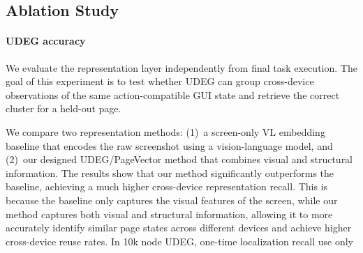 \subsection{Ablation Study}
\label{sec:eval-transfer}

\paragraph{UDEG accuracy}
We evaluate the representation layer independently from final task execution.
The goal of this experiment is to test whether UDEG can group cross-device
observations of the same action-compatible GUI state and retrieve the correct
cluster for a held-out page.

We compare two representation methods: (1)~a screen-only VL embedding baseline that encodes the raw screenshot using a vision-language model, and (2)~our designed UDEG/PageVector method that combines visual and structural information.  The results show that our method significantly outperforms the baseline, achieving a much higher cross-device representation recall.  This is because the baseline only captures the visual features of the screen, while our method captures both visual and structural information, allowing it to more accurately identify similar page states across different devices and achieve higher cross-device reuse rates. In 10k node UDEG, one-time localization recall use only %
\begin{table}[t]
  \centering
  \caption{Cross-device representation recall and encoding cost.}
  \label{tab:udeg-equivalence}
\end{table}




